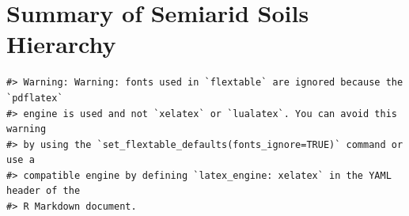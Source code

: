 \documentclass[
  letterpaper,
  DIV=11,
  numbers=noendperiod]{scrreprt}
\begin{document}
\hypertarget{sec-sum-S}{%
\section{Summary of Semiarid Soils Hierarchy}\label{sec-sum-S}}

\begin{verbatim}
#> Warning: Warning: fonts used in `flextable` are ignored because the `pdflatex`
#> engine is used and not `xelatex` or `lualatex`. You can avoid this warning
#> by using the `set_flextable_defaults(fonts_ignore=TRUE)` command or use a
#> compatible engine by defining `latex_engine: xelatex` in the YAML header of the
#> R Markdown document.
\end{verbatim}

\providecommand{\docline}[3]{\noalign{\global\setlength{\arrayrulewidth}{#1}}\arrayrulecolor[HTML]{#2}\cline{#3}}

\setlength{\tabcolsep}{2pt}

\renewcommand*{\arraystretch}{1.5}
\end{document}
